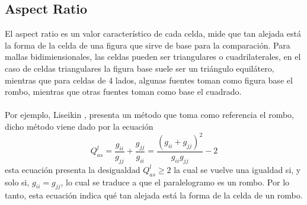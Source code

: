 \documentclass[letterpaper, openright, 12pt]{book}
\begin{document}
    \subsection*{Aspect Ratio}
        El aspect ratio es un valor característico de cada celda, mide que tan
        alejada está la forma de la celda de una figura que sirve de base para
        la comparación. Para mallas bidimiensionales, las celdas pueden ser
        triangulares o cuadrilaterales, en el caso de celdas triangulares la
        figura base suele ser un triángulo equilátero, mientras que para celdas
        de 4 lados, algunas fuentes toman como figura base el rombo, mientras
        que otras fuentes toman como base el cuadrado.

    \paragraph*{}
        Por ejemplo, Liseikin \cite{vladimir-grid}, presenta un método que toma
        como referencia el rombo, dicho método viene dado por la ecuación
        \begin{equation}
            Q_{as}^{l} = \frac{g_{ii}}{g_{jj}} + \frac{g_{jj}}{g_{ii}}
                = \frac{\left( g_{ii} + g_{jj} \right)^2}{g_{ii} g_{jj}} - 2
       \end{equation}
       esta ecuación presenta la desigualdad $Q_{as}^{l} \geq 2$ la cual se
       vuelve una igualdad si, y solo si, $g_{ii} = g_{jj}$, lo cual se traduce
       a que el paralelogramo es un rombo. Por lo tanto, esta ecuación
       indica qué tan alejada está la forma de la celda de un rombo.
\end{document}
